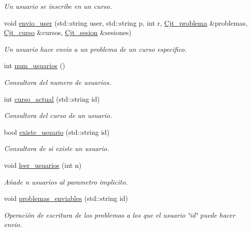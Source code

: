 \begin{DoxyCompactItemize}
\begin{DoxyCompactList}\small\item\em Un usuario se inscribe en un curso. \end{DoxyCompactList}\item 
void \mbox{\hyperlink{class_cjt__usuario_a239dce70ba54f8a8f41fd180b703b7c9}{envio\+\_\+user}} (std\+::string user, std\+::string p, int r, \mbox{\hyperlink{class_cjt__problema}{Cjt\+\_\+problema}} \&problemas, \mbox{\hyperlink{class_cjt__curso}{Cjt\+\_\+curso}} \&cursos, \mbox{\hyperlink{class_cjt__sesion}{Cjt\+\_\+sesion}} \&sesiones)
\begin{DoxyCompactList}\small\item\em Un usuario hace envio a un problema de un curso especifico. \end{DoxyCompactList}\item 
int \mbox{\hyperlink{class_cjt__usuario_a92ec4442d4a6e8d50f4eb36413ade07e}{num\+\_\+usuarios}} ()
\begin{DoxyCompactList}\small\item\em Consultora del numero de usuarios. \end{DoxyCompactList}\item 
int \mbox{\hyperlink{class_cjt__usuario_aa21aa736c5b2094fe5d21415f1761cfa}{curso\+\_\+actual}} (std\+::string id)
\begin{DoxyCompactList}\small\item\em Consultora del curso de un usuario. \end{DoxyCompactList}\item 
bool \mbox{\hyperlink{class_cjt__usuario_a2d4478e6b967659040f5a0b86b665204}{existe\+\_\+usuario}} (std\+::string id)
\begin{DoxyCompactList}\small\item\em Consultora de si existe un usuario. \end{DoxyCompactList}\item 
void \mbox{\hyperlink{class_cjt__usuario_a75a98423be866287a841a77849ea3e6f}{leer\+\_\+usuarios}} (int n)
\begin{DoxyCompactList}\small\item\em Añade n usuarios al parametro implicito. \end{DoxyCompactList}\item 
void \mbox{\hyperlink{class_cjt__usuario_adf8f61c7eacd7328896c168adb3e63cd}{problemas\+\_\+enviables}} (std\+::string id)
\begin{DoxyCompactList}\small\item\em Operación de escritura de los problemas a los que el usuario \char`\"{}id\char`\"{} puede hacer envio. \end{DoxyCompactList}\item 

\end{DoxyCompactItemize}
